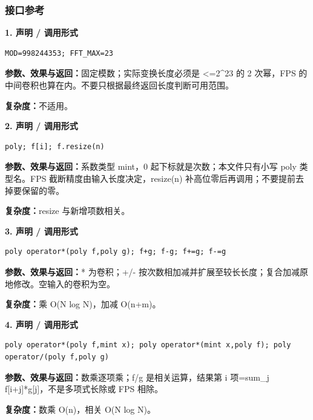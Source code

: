 \documentclass[UTF8,a4paper,10pt]{ctexart}
\begin{document}
\subsubsection*{接口参考}
\noindent\begin{minipage}{\textwidth}
\textbf{1. 声明 / 调用形式}
\begin{lstlisting}
MOD=998244353; FFT_MAX=23
\end{lstlisting}
\textbf{参数、效果与返回：}固定模数；实际变换长度必须是 <=2\textasciicircum{}23 的 2 次幂，FPS 的中间卷积也算在内。不要只根据最终返回长度判断可用范围。

\textbf{复杂度：}不适用。

\end{minipage}\par\vspace{0.4em}
\noindent\begin{minipage}{\textwidth}
\textbf{2. 声明 / 调用形式}
\begin{lstlisting}
poly; f[i]; f.resize(n)
\end{lstlisting}
\textbf{参数、效果与返回：}系数类型 mint，0 起下标就是次数；本文件只有小写 poly 类型名。FPS 截断精度由输入长度决定，resize(n) 补高位零后再调用；不要提前去掉要保留的零。

\textbf{复杂度：}resize 与新增项数相关。

\end{minipage}\par\vspace{0.4em}
\noindent\begin{minipage}{\textwidth}
\textbf{3. 声明 / 调用形式}
\begin{lstlisting}
poly operator*(poly f,poly g); f+g; f-g; f+=g; f-=g
\end{lstlisting}
\textbf{参数、效果与返回：}* 为卷积；+/- 按次数相加减并扩展至较长长度；复合加减原地修改。空输入的卷积为空。

\textbf{复杂度：}乘 O(N log N)，加减 O(n+m)。

\end{minipage}\par\vspace{0.4em}
\noindent\begin{minipage}{\textwidth}
\textbf{4. 声明 / 调用形式}
\begin{lstlisting}
poly operator*(poly f,mint x); poly operator*(mint x,poly f); poly operator/(poly f,poly g)
\end{lstlisting}
\textbf{参数、效果与返回：}数乘逐项乘；f/g 是相关运算，结果第 i 项=sum\_j f[i+j]*g[j]，不是多项式长除或 FPS 相除。

\textbf{复杂度：}数乘 O(n)，相关 O(N log N)。

\end{minipage}\par\vspace{0.4em}
\end{document}
